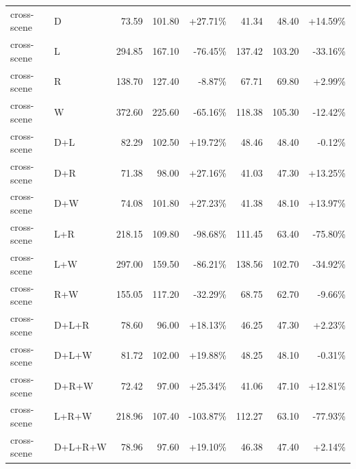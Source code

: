 \documentclass[UTF8,10pt]{ctexart}
\newcommand{\better}[1]{\textcolor{goodblue}{#1}}
\newcommand{\worse}[1]{\textcolor{badred}{#1}}
\begin{document}
{\begin{longtable}{llrrrrrr}
cross-scene & D & 73.59 & 101.80 & \better{+27.71\%} & 41.34 & 48.40 & \better{+14.59\%}\\
cross-scene & L & 294.85 & 167.10 & \worse{-76.45\%} & 137.42 & 103.20 & \worse{-33.16\%}\\
cross-scene & R & 138.70 & 127.40 & \worse{-8.87\%} & 67.71 & 69.80 & \better{+2.99\%}\\
cross-scene & W & 372.60 & 225.60 & \worse{-65.16\%} & 118.38 & 105.30 & \worse{-12.42\%}\\
cross-scene & D+L & 82.29 & 102.50 & \better{+19.72\%} & 48.46 & 48.40 & \worse{-0.12\%}\\
cross-scene & D+R & 71.38 & 98.00 & \better{+27.16\%} & 41.03 & 47.30 & \better{+13.25\%}\\
cross-scene & D+W & 74.08 & 101.80 & \better{+27.23\%} & 41.38 & 48.10 & \better{+13.97\%}\\
cross-scene & L+R & 218.15 & 109.80 & \worse{-98.68\%} & 111.45 & 63.40 & \worse{-75.80\%}\\
cross-scene & L+W & 297.00 & 159.50 & \worse{-86.21\%} & 138.56 & 102.70 & \worse{-34.92\%}\\
cross-scene & R+W & 155.05 & 117.20 & \worse{-32.29\%} & 68.75 & 62.70 & \worse{-9.66\%}\\
cross-scene & D+L+R & 78.60 & 96.00 & \better{+18.13\%} & 46.25 & 47.30 & \better{+2.23\%}\\
cross-scene & D+L+W & 81.72 & 102.00 & \better{+19.88\%} & 48.25 & 48.10 & \worse{-0.31\%}\\
cross-scene & D+R+W & 72.42 & 97.00 & \better{+25.34\%} & 41.06 & 47.10 & \better{+12.81\%}\\
cross-scene & L+R+W & 218.96 & 107.40 & \worse{-103.87\%} & 112.27 & 63.10 & \worse{-77.93\%}\\
cross-scene & D+L+R+W & 78.96 & 97.60 & \better{+19.10\%} & 46.38 & 47.40 & \better{+2.14\%}\\

\bottomrule
\end{longtable}
}
\end{document}
